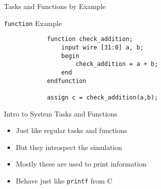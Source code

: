 \documentclass[table,dvipsnames,colorlinks=true]{beamer}
\begin{document}
\begin{frame}[fragile]{Tasks and Functions by Example}
    \begin{block}{\texttt{function} Example}
        \vspace*{-12pt}
        \begin{verbatim}
            function check_addition;
                input wire [31:0] a, b;
                begin
                    check_addition = a + b;
                end
            endfunction

            assign c = check_addition(a,b);
        \end{verbatim}
    \end{block}
\end{frame}

\begin{frame}{Intro to System Tasks and Functions}
    \begin{itemize}
        \item Just like regular tasks and functions
        \item But they introspect the simulation
        \item Mostly these are used to print information
        \item Behave just like \texttt{printf} from C
    \end{itemize}
\end{frame}
\end{document}
